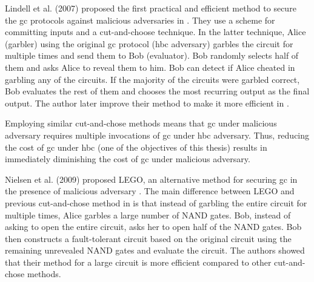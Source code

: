 Lindell et al. (2007) proposed the first practical and efficient method to secure the \acrshort{gc} protocols against malicious adversaries in \cite{lindell2007efficient}.
They use a scheme for committing inputs and a cut-and-choose technique.
In the latter technique, Alice (garbler) using the original \acrshort{gc} protocol (\acrshort{hbc} adversary) garbles the circuit for multiple times and send them to Bob (evaluator).
Bob randomly selects half of them and asks Alice to reveal them to him.
Bob can detect if Alice cheated in garbling any of the circuits.
If the majority of the circuits were garbled correct, Bob evaluates the rest of them and chooses the most recurring output as the final output.
The author later improve their method to make it more efficient in \cite{lindell2012secure}.

Employing similar cut-and-chose methods means that \acrshort{gc} under malicious adversary requires multiple invocations of \acrshort{gc} under \acrshort{hbc} adversary.
Thus, reducing the cost of \acrshort{gc} under \acrshort{hbc} (one of the objectives of this thesis) results in immediately diminishing the cost of \acrshort{gc} under malicious adversary.

Nielsen et al. (2009) proposed LEGO, an alternative method for securing \acrshort{gc} in the presence of malicious adversary \cite{nielsen2009lego}.
The main difference between LEGO and previous cut-and-chose method in \cite{lindell2007efficient, lindell2012secure} is that instead of garbling the entire circuit for multiple times, Alice garbles a large number of NAND gates.
Bob, instead of asking to open the entire circuit, asks her to open half of the NAND gates.
Bob then constructs a fault-tolerant circuit based on the original circuit using the remaining unrevealed NAND gates and evaluate the circuit.
The authors showed that their method for a large circuit is more efficient compared to other cut-and-chose methods.
